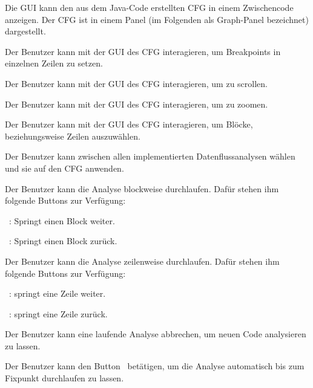 Die GUI kann den aus dem Java-Code erstellten CFG in einem Zwischencode anzeigen. Der CFG ist in einem Panel (im Folgenden als Graph-Panel bezeichnet) dargestellt.

Der Benutzer kann mit der GUI des CFG interagieren, um Breakpoints in einzelnen Zeilen zu setzen.

Der Benutzer kann mit der GUI des CFG interagieren, um zu scrollen.

Der Benutzer kann mit der GUI des CFG interagieren, um zu zoomen.

Der Benutzer kann mit der GUI des CFG interagieren, um Blöcke, beziehungsweise Zeilen auszuwählen.

Der Benutzer kann zwischen allen implementierten Datenflussanalysen wählen und sie auf den CFG anwenden.

\newpage

Der Benutzer kann die Analyse blockweise durchlaufen. Dafür stehen ihm folgende Buttons zur Verfügung:\par
\faFastForward\ : Springt einen Block weiter.\par
\faFastBackward\ : Springt einen Block zurück.

Der Benutzer kann die Analyse zeilenweise durchlaufen. Dafür stehen ihm folgende Buttons zur Verfügung:\par
\faStepForward\ : springt eine Zeile weiter.\par
\faStepBackward\ : springt eine Zeile zurück.

Der Benutzer kann eine laufende Analyse abbrechen, um neuen Code analysieren zu lassen.

Der Benutzer kann den Button  \faPlay\  betätigen, um die Analyse automatisch bis zum Fixpunkt durchlaufen zu lassen.

